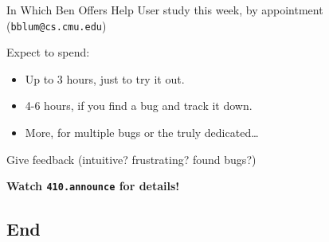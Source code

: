 \documentclass[xcolor=dvipsnames]{beamer}
\begin{document}
{\begin{frame}{In Which Ben Offers Help}
	User study this week, by appointment (\texttt{bblum@cs.cmu.edu})

	\linegap
	Expect to spend:
	\begin{itemize}
		\item Up to 3 hours, just to try it out.
		\item 4-6 hours, if you find a bug and track it down.
		\item More, for multiple bugs or the truly dedicated\ldots
	\end{itemize}
	\linegap

	Give feedback (intuitive? frustrating? found bugs?)

	\linegap
	{\bf Watch \texttt{410.announce} for details!}
\end{frame}

\subsection{End}
}



% 
\end{document}
